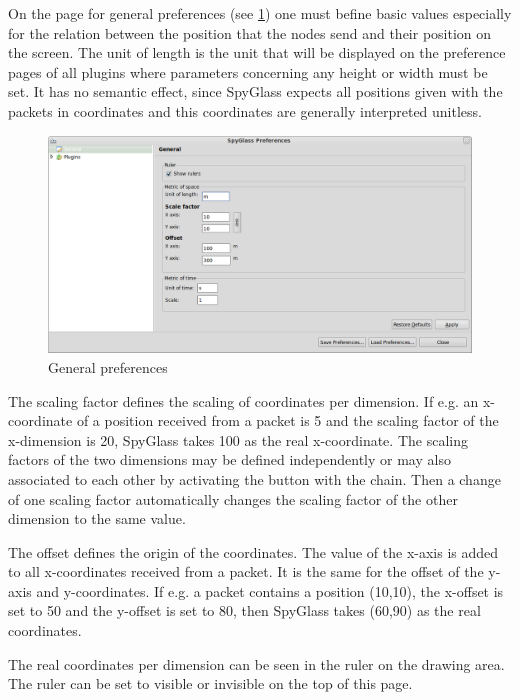 On the page for general preferences (see \ref{pic:generalpreferences}) one must befine basic values especially for the
relation between the position that
the nodes send and their position on the screen. The unit of length is the unit that will be displayed on the
preference pages of all plugins where parameters concerning any height or width must be set. It has no semantic effect, since
SpyGlass expects all positions given with the packets in coordinates and this coordinates are generally interpreted unitless.

\begin{figure}[htb]
  \begin{center}
    \includegraphics[width=13.2cm]{./pics/general_prefpage}
    \caption{General preferences}
    \label{pic:generalpreferences}
  \end{center}
\end{figure}

The scaling factor defines the scaling of coordinates per dimension. If e.g. an x-coordinate of a position received from
a packet is 5 and the scaling factor of the x-dimension is 20, SpyGlass takes 100 as the real x-coordinate. The scaling
factors of the two dimensions may be defined independently or may also associated to each other by activating the button
with the chain. Then a change of one scaling factor automatically changes the scaling factor of the other dimension to the
same value.

The offset defines the origin of the coordinates. The value of the x-axis is added to all x-coordinates received from a packet.
It is the same for the offset of the y-axis and y-coordinates. If e.g. a packet contains a position (10,10), the x-offset is
set to 50 and the y-offset is set to 80, then SpyGlass takes (60,90) as the real coordinates.

The real coordinates per dimension can be seen in the ruler on the drawing area. The ruler can be set to visible or invisible
on the top of this page.

